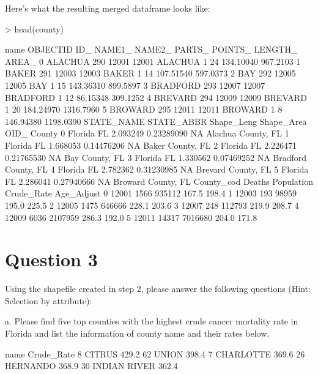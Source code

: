 \documentclass{article}
\begin{document}

Here's what the resulting merged dataframe looks like:

\begin{Schunk}
\begin{Sinput}
> head(county)
\end{Sinput}
\begin{Soutput}
      name OBJECTID   ID_ NAME1_   NAME2_ PARTS_ POINTS_   LENGTH_     AREA_
0  ALACHUA      290 12001  12001  ALACHUA      1      24 134.10040  967.2103
1    BAKER      291 12003  12003    BAKER      1      14 107.51540  597.0373
2      BAY      292 12005  12005      BAY      1      15 143.36310  899.5897
3 BRADFORD      293 12007  12007 BRADFORD      1      12  86.15348  309.1252
4  BREVARD      294 12009  12009  BREVARD      1      20 184.24970 1316.7960
5  BROWARD      295 12011  12011  BROWARD      1       8 146.94380 1198.0390
  STATE_NAME STATE_ABBR Shape_Leng Shape_Area OID_              County
0    Florida         FL   2.093249 0.23289090   NA  Alachua County, FL
1    Florida         FL   1.668053 0.14476206   NA    Baker County, FL
2    Florida         FL   2.226471 0.21765530   NA      Bay County, FL
3    Florida         FL   1.330562 0.07469252   NA Bradford County, FL
4    Florida         FL   2.782362 0.31230985   NA  Brevard County, FL
5    Florida         FL   2.286041 0.27940666   NA  Broward County, FL
  County_cod Deaths Population Crude_Rate Age_Adjust
0      12001   1566     935112      167.5      198.4
1      12003    193      98959      195.0      225.5
2      12005   1475     646666      228.1      203.6
3      12007    248     112793      219.9      208.7
4      12009   6036    2107959      286.3      192.0
5      12011  14317    7016680      204.0      171.8
\end{Soutput}
\end{Schunk}


\section*{Question 3}
Using the shapefile created in step 2, please answer the following questions (Hint: Selection by attribute):

a.  Please find five top counties with the highest crude cancer mortality rate in Florida and list the information of county name and their rates below.

\begin{Schunk}
\begin{Soutput}
           name Crude_Rate
8        CITRUS      429.2
62        UNION      398.4
7     CHARLOTTE      369.6
26     HERNANDO      368.9
30 INDIAN RIVER      362.4
\end{Soutput}
\end{Schunk}
\end{document}
